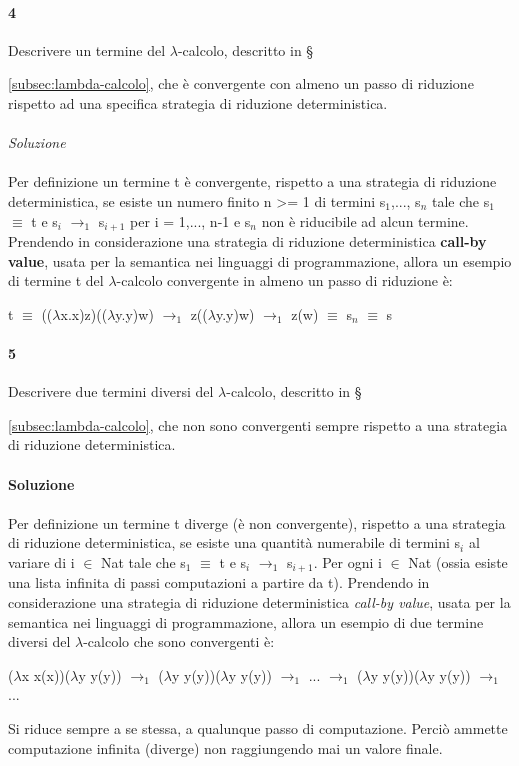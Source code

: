 \documentclass[10pt,a4paper, italian]{book}
\begin{document}
\paragraph{4}
Descrivere un termine del $\lambda$-calcolo, descritto in \S{\ref{subsec:lambda-calcolo},  che \`e convergente con almeno un passo di riduzione rispetto ad una specifica strategia di riduzione deterministica.\\\\
\textit{Soluzione}\\\\
Per definizione un termine t \`e convergente, rispetto a una strategia di
riduzione deterministica, se esiste un numero finito n >= 1 di termini s$_1$,..., s$_n$ tale che s$_1$ $\equiv$ t e s$_i$ $\rightarrow_1$ s$_{i + 1}$ per i = 1,..., n-1 e s$_n$ non \`e riducibile ad alcun termine.\\
Prendendo in considerazione una strategia di riduzione deterministica \textbf{call-by value}, usata per la semantica nei linguaggi di programmazione, allora un esempio di termine t del $\lambda$-calcolo convergente in almeno un passo di riduzione \`e:
\begin{center}t $\equiv$ (($\lambda$x.x)z)(($\lambda$y.y)w) $\rightarrow_1$ z(($\lambda$y.y)w) $\rightarrow_1$ z(w) $\equiv$ s$_n$ $\equiv$ s\end{center}
\paragraph{5} 
Descrivere due termini diversi del $\lambda$-calcolo, descritto in \S{\ref{subsec:lambda-calcolo}, che non sono convergenti sempre rispetto a una strategia di riduzione deterministica.\\\\
\textbf{Soluzione}\\\\
Per definizione un termine t diverge (\`e non convergente), rispetto a una strategia
di riduzione deterministica, se esiste una quantit\`a numerabile di termini s$_i$ al variare di i $\in$ Nat tale che s$_1$ $\equiv$ t e s$_i$ $\rightarrow_1$ s$_{i+1}$. Per ogni i $\in$ Nat (ossia esiste una lista infinita di passi computazioni a partire da t).
Prendendo in considerazione una strategia di riduzione deterministica \textit{call-by value}, usata per la semantica nei linguaggi di programmazione, allora un esempio di due termine diversi del $\lambda$-calcolo che sono convergenti \`e:
\begin{center}($\lambda$x x(x))($\lambda$y y(y)) $\rightarrow_1$ ($\lambda$y y(y))($\lambda$y y(y))  $\rightarrow_1$ ... $\rightarrow_1$ ($\lambda$y y(y))($\lambda$y y(y)) $\rightarrow_1$ ... \end{center}
Si riduce sempre a se stessa, a qualunque passo di computazione. Perci\`o ammette computazione infinita (diverge) non raggiungendo mai un valore finale.
}}
\end{document}
